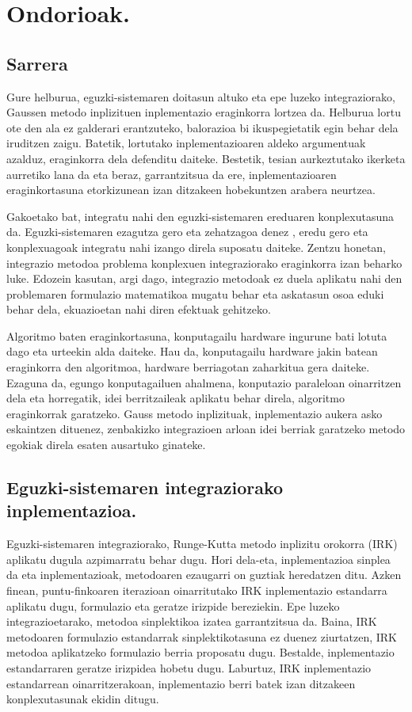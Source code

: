 \chapter{Ondorioak.}


\section*{Sarrera}

Gure helburua, eguzki-sistemaren doitasun altuko eta epe luzeko integraziorako, Gaussen metodo inplizituen inplementazio eraginkorra lortzea da. Helburua lortu ote den ala ez galderari erantzuteko, balorazioa bi ikuspegietatik egin behar dela iruditzen zaigu. Batetik, lortutako inplementazioaren aldeko argumentuak azalduz, eraginkorra dela defenditu daiteke. Bestetik, tesian aurkeztutako ikerketa aurretiko lana da eta beraz, garrantzitsua da ere, inplementazioaren eraginkortasuna etorkizunean izan ditzakeen hobekuntzen arabera neurtzea. 

Gakoetako bat, integratu nahi den eguzki-sistemaren ereduaren konplexutasuna da. Eguzki-sistemaren ezagutza gero eta zehatzagoa denez \cite{Kaplan2015}, eredu gero eta konplexuagoak integratu nahi izango direla suposatu daiteke. Zentzu honetan, integrazio metodoa problema konplexuen integraziorako eraginkorra izan beharko luke. Edozein kasutan, argi dago, integrazio metodoak  ez duela aplikatu nahi den problemaren formulazio matematikoa mugatu behar eta askatasun osoa eduki behar dela, ekuazioetan nahi diren efektuak gehitzeko.   

Algoritmo baten eraginkortasuna, konputagailu hardware ingurune bati lotuta dago eta urteekin alda daiteke. Hau da,  konputagailu hardware jakin batean eraginkorra den algoritmoa, hardware berriagotan zaharkitua gera daiteke.  Ezaguna da, egungo konputagailuen ahalmena, konputazio paraleloan oinarritzen dela eta horregatik, idei berritzaileak aplikatu behar direla, algoritmo eraginkorrak garatzeko. Gauss metodo inplizituak, inplementazio aukera asko eskaintzen dituenez, zenbakizko integrazioen arloan idei berriak garatzeko metodo egokiak direla \cite{Dongarra2017} esaten ausartuko ginateke.   


\section*{Eguzki-sistemaren integraziorako inplementazioa.}


Eguzki-sistemaren integraziorako, Runge-Kutta metodo inplizitu orokorra (IRK) aplikatu dugula azpimarratu behar dugu. Hori dela-eta, inplementazioa sinplea da eta inplementazioak, metodoaren ezaugarri on guztiak heredatzen ditu. Azken finean, puntu-finkoaren iterazioan oinarritutako IRK inplementazio estandarra aplikatu dugu, formulazio eta geratze irizpide bereziekin. Epe luzeko integrazioetarako, metodoa sinplektikoa izatea garrantzitsua da. Baina, IRK metodoaren formulazio estandarrak  sinplektikotasuna ez duenez ziurtatzen, IRK metodoa aplikatzeko formulazio berria proposatu dugu. Bestalde, inplementazio estandarraren geratze irizpidea hobetu dugu. Laburtuz, IRK inplementazio estandarrean oinarritzerakoan, inplementazio berri batek izan ditzakeen konplexutasunak ekidin ditugu. 


